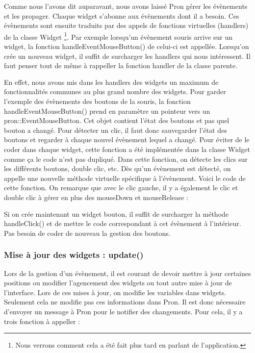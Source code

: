 Comme nous l'avons dit auparavant, nous avons laissé Pron gérer les évènements et les propager.
Chaque widget s'abonne aux évènements dont il a besoin.
Ces évènements sont ensuite traduits par des appels de fonctions virtuelles (handlers) de la classe Widget
\footnote{Nous verrons comment cela a été fait plus tard en parlant de l'application.}.
Par exemple lorsqu'un évènement souris arrive sur un widget, la fonction handleEventMouseButton() de celui-ci est appellée.
Lorsqu'on crée un nouveau widget, il suffit de surcharger les handlers qui nous intéressent. Il faut penser tout de même à rappeller la fonction handler de la classe parente.

En effet, nous avons mis dans les handlers des widgets un maximum de fonctionnalités communes au plus grand nombre des widgets.
Pour garder l'exemple des évènements des boutons de la souris, la fonction handleEventMouseButton() prend en paramètre un pointeur vers un pron::EventMouseButton.
Cet objet contient l'état des boutons et pas quel bouton a changé.
Pour détecter un clic, il faut donc sauvegarder l'état des boutons et regarder à chaque nouvel évènement lequel a changé.
Pour éviter de le coder dans chaque widget, cette fonction a été implémentée dans la classe Widget comme ça le code n'est pas dupliqué.
Dans cette fonction, on détecte les clics sur les différents boutons, double clic, etc.
Dès qu'un évènement est détecté, on appelle une nouvelle méthode virtuelle spécifique à l'évènement.
Voici le code de cette fonction. On remarque que avec le clic gauche, il y a également le clic et double clic à gérer en plus des mouseDown et mouseRelease :



Si on crée maintenant un widget bouton, il suffit de surcharger la méthode handleClick() et de mettre le code correspondant à cet évènement à l'intérieur.
Pas besoin de coder de nouveau la gestion des boutons.

\subsubsection{Mise à jour des widgets : update()}

Lors de la gestion d'un évènement, il est courant de devoir mettre à jour certaines positions ou modifier l'agencement des widgets ou tout autre mise à jour de l'interface.
Lors de ces mises à jour, on modifie les variables dans widgets.
Seulement cela ne modifie pas ces informations dans Pron.
Il est donc nécessaire d'envoyer un message à Pron pour le notifier des changements.
Pour cela, il y a trois fonction à appeller :

